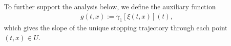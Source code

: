 \documentclass[a4paper]{article}
\theoremstyle{definition}
\theoremstyle{plain}
\begin{document}
%

To further support the analysis below, we define the auxiliary function
\begin{align}
  g(t, x) := \dot{\gamma}_{1}[\xi(t, x)](t),
\end{align}
which gives the slope of the unique
stopping trajectory through each point $(t, x) \in U$.
\end{document}

